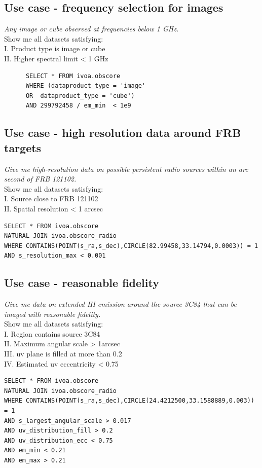 \subsection{Use case - frequency selection  for images }
\textit{Any image or cube observed at frequencies below 1 GHz.}\\ 
Show me all datasets satisfying:\\
I. Product type is image or cube \\
II. Higher spectral limit < 1 GHz
\begin{verbatim}
      SELECT * FROM ivoa.obscore
      WHERE (dataproduct_type = 'image' 
      OR  dataproduct_type = 'cube') 
      AND 299792458 / em_min  < 1e9
\end{verbatim}
 


\subsection{Use case - high resolution data around FRB targets }

\textit{Give me high-resolution data on possible persistent radio sources within an arc second of FRB 121102.} \\ Show me all datasets satisfying: \\
I. Source close to FRB 121102 \\
II. Spatial resolution <  1 arcsec
\begin{verbatim}
SELECT * FROM ivoa.obscore 
NATURAL JOIN ivoa.obscore_radio
WHERE CONTAINS(POINT(s_ra,s_dec),CIRCLE(82.99458,33.14794,0.0003)) = 1 
AND s_resolution_max < 0.001
\end{verbatim}

\subsection{Use case - reasonable fidelity}

\textit{Give me data on extended HI emission around the source 3C84 that can
be imaged with reasonable fidelity.}\\ 
Show me all datasets satisfying: \\
I. Region contains source 3C84  \\
II. Maximum angular scale > 1arcsec \\
III. uv plane is filled at more than 0.2\\
IV. Estimated uv eccentricity < 0.75
\begin{verbatim}
SELECT * FROM ivoa.obscore 
NATURAL JOIN ivoa.obscore_radio
WHERE CONTAINS(POINT(s_ra,s_dec),CIRCLE(24.4212500,33.1588889,0.003)) = 1 
AND s_largest_angular_scale > 0.017
AND uv_distribution_fill > 0.2 
AND uv_distribution_ecc < 0.75 
AND em_min < 0.21 
AND em_max > 0.21
\end{verbatim}

